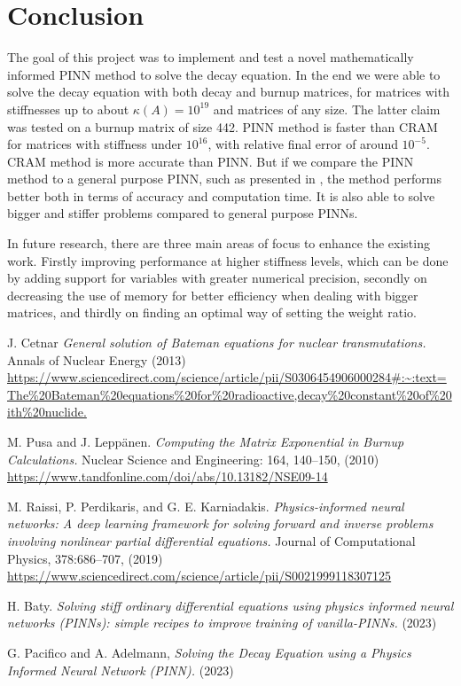 \documentclass[10pt]{article}
\begin{document}
\section{Conclusion}
The goal of this project was to implement and test a novel mathematically informed PINN method to solve the decay equation. In the end we were able to solve the decay equation with both decay and burnup matrices, for matrices with stiffnesses up to about $\kappa(A) = 10^{19}$ and matrices of any size. The latter claim was tested on a burnup matrix of size 442. PINN method is faster than CRAM for matrices with stiffness under $10^{16}$, with relative final error of around $10^{-5}$. CRAM method is more accurate than PINN. But if we compare the PINN method to a general purpose PINN, such as presented in \cite{cit:gugli}, the method performs better both in terms of accuracy and computation time. It is also able to solve bigger and stiffer problems compared to general purpose PINNs.

In future research, there are three main areas of focus to enhance the existing work. Firstly improving performance at higher stiffness levels, which can be done by adding support for variables with greater numerical precision, secondly on decreasing the use of memory for better efficiency when dealing with bigger matrices, and thirdly on finding an optimal way of setting the weight ratio.


\newpage
\begin{thebibliography}{5}   
        J. Cetnar
        \textit{General solution of Bateman equations for nuclear transmutations.}
        Annals of Nuclear Energy (2013)        \url{https://www.sciencedirect.com/science/article/pii/S0306454906000284#:~:text=The\%20Bateman\%20equations\%20for\%20radioactive,decay\%20constant\%20of\%20ith\%20nuclide.}

        M. Pusa and J. Leppänen.
        \textit{Computing the Matrix Exponential in Burnup Calculations.}
        Nuclear Science and Engineering: 164, 140–150, (2010)\\
        \url{https://www.tandfonline.com/doi/abs/10.13182/NSE09-14}

         M. Raissi, P. Perdikaris, and G. E. Karniadakis.
         \textit{Physics-informed neural networks: A deep learning framework for solving forward and inverse problems involving nonlinear partial differential equations.}
         Journal of Computational Physics, 378:686–707, (2019)\\
         \url{https://www.sciencedirect.com/science/article/pii/S0021999118307125}

        H. Baty. \textit{Solving stiff ordinary differential equations using physics informed neural networks (PINNs): simple recipes to improve training of vanilla-PINNs.} (2023)

        G. Pacifico and A. Adelmann, \textit{Solving the Decay Equation using a Physics Informed Neural Network (PINN).} (2023)

\end{thebibliography}
\end{document}

